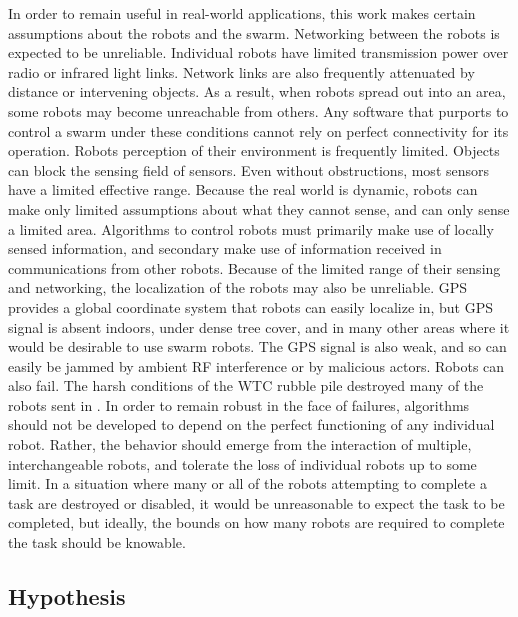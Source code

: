 \documentclass[]{article}
\begin{document}
In order to remain useful in real-world applications, this work makes certain assumptions about the robots and the swarm. 
Networking between the robots is expected to be unreliable. 
Individual robots have limited transmission power over radio or infrared light links. 
Network links are also frequently attenuated by distance or intervening objects. 
As a result, when robots spread out into an area, some robots may become unreachable from others. 
Any software that purports to control a swarm under these conditions cannot rely on perfect connectivity for its operation. 
Robots perception of their environment is frequently limited. 
Objects can block the sensing field of sensors.
Even without obstructions, most sensors have a limited effective range. 
Because the real world is dynamic, robots can make only limited assumptions about what they cannot sense, and can only sense a limited area. 
Algorithms to control robots must primarily make use of locally sensed information, and secondary make use of information received in communications from other robots. 
Because of the limited range of their sensing and networking, the localization of the robots may also be unreliable. 
GPS provides a global coordinate system that robots can easily localize in, but GPS signal is absent indoors, under dense tree cover, and in many other areas where it would be desirable to use swarm robots. 
The GPS signal is also weak, and so can easily be jammed by ambient RF interference or by malicious actors. 
Robots can also fail. 
The harsh conditions of the WTC rubble pile destroyed many of the robots sent in \cite{Micire02analysisof}.
In order to remain robust in the face of failures, algorithms should not be developed to depend on the perfect functioning of any individual robot. 
Rather, the behavior should emerge from the interaction of multiple, interchangeable robots, and tolerate the loss of individual robots up to some limit. 
In a situation where many or all of the robots attempting to complete a task are destroyed or disabled, it would be unreasonable to expect the task to be completed, but ideally, the bounds on how many robots are required to complete the task should be knowable. 

\subsection{Hypothesis}
\end{document}
